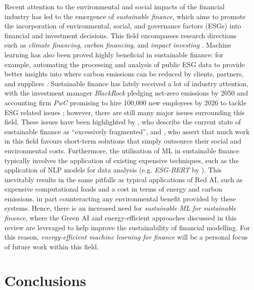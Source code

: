 \documentclass[a4paper, 12pt]{article}
\begin{document}
    Recent attention to the environmental and social impacts of the financial industry has led to the emergence of \emph{sustainable finance}, which aims to promote the incorporation of environmental, social, and governance factors (ESGs) into financial and investment decisions. This field encompasses research directions such as \emph{climate financing}, \emph{carbon financing}, and \emph{impact investing} \cite{kumar-2022}. Machine learning has also been proved highly beneficial in sustainable finance: for example, automating the processing and analysis of public ESG data to provide better insights into where carbon emissions can be reduced by clients, partners, and suppliers \cite{esg-global-survey}. Sustainable finance has lately received a lot of industry attention, with the investment manager \emph{BlackRock} pledging net-zero emissions by 2050 \cite{blackrock-report} and accounting firm \emph{PwC} promising to hire 100,000 new employees by 2026 to tackle ESG related issues \cite{reuters-article}; however, there are still many major issues surrounding this field. These issues have been highlighted by , who describe the current state of sustainable finance as ``excessively fragmented”, and , who assert that much work in this field favours short-term solutions that simply outsource their social and environmental costs. Furthermore, the utilisation of ML in sustainable finance typically involves the application of existing expensive techniques, such as the application of NLP models for data analysis (e.g. \emph{ESG-BERT} by ). This inevitably results in the same pitfalls as typical applications of Red AI, such as expensive computational loads and a cost in terms of energy and carbon emissions, in part counteracting any environmental benefit provided by these systems. Hence, there is an increased need for \emph{sustainable ML for sustainable finance}, where the Green AI and energy-efficient approaches discussed in this review are leveraged to help improve the sustainability of financial modelling. For this reason, \emph{energy-efficient machine learning for finance} will be a personal focus of future work within this field.


    \section{Conclusions}
\end{document}
